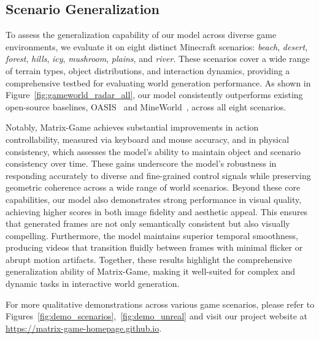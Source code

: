 \documentclass{article}
\begin{document}
\subsection{Scenario Generalization}
To assess the generalization capability of our model across diverse game environments, we evaluate it on eight distinct Minecraft scenarios: \textit{beach}, \textit{desert}, \textit{forest}, \textit{hills}, \textit{icy}, \textit{mushroom}, \textit{plains}, and \textit{river}. These scenarios cover a wide range of terrain types, object distributions, and interaction dynamics, providing a comprehensive testbed for evaluating world generation performance.
As shown in Figure~\ref{fig:gameworld_radar_all}, our model consistently outperforms existing open-source baselines, OASIS~\cite{oasis2024} and MineWorld~\cite{guo2025mineworld}, across all eight scenarios.  


Notably, {Matrix-Game} achieves substantial improvements in {action controllability}, measured via keyboard and mouse accuracy, and in {physical consistency}, which assesses the model’s ability to maintain object and scenario consistency over time. These gains underscore the model’s robustness in responding accurately to diverse and fine-grained control signals while preserving geometric coherence across a wide range of world scenarios.
Beyond these core capabilities, our model also demonstrates strong performance in {visual quality}, achieving higher scores in both image fidelity and aesthetic appeal. This ensures that generated frames are not only semantically consistent but also visually compelling. Furthermore, the model maintains superior {temporal smoothness}, producing videos that transition fluidly between frames with minimal flicker or abrupt motion artifacts.
Together, these results highlight the comprehensive generalization ability of {Matrix-Game}, making it well-suited for complex and dynamic tasks in interactive world generation. 

For more qualitative demonstrations across various game scenarios, please refer to Figures~\ref{fig:demo_scenarios},~\ref{fig:demo_unreal} and visit our project website at \url{https://matrix-game-homepage.github.io}.


 
\end{document}
